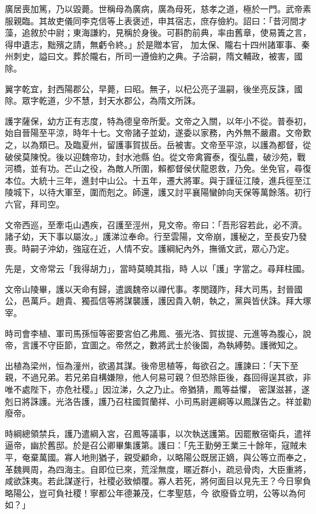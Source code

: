 \begin{pinyinscope}
 廣居喪加篤，乃以毀薨。世稱母為廣病，廣為母死，慈孝之道，極於一門。武帝素服親臨。其故吏儀同李克信等上表褒述，申其宿志，庶存儉約。詔曰：「昔河間才藻，追敘於中尉；東海謙約，見稱於身後。可斟酌前典，率由舊章，使易簀之言，得申遺志，黜殯之請，無虧令終。」於是贈本官，
 加太保、隴右十四州諸軍事、秦州刺史，謚曰文。葬於隴右，所司一遵儉約之典。子洽嗣，隋文輔政，被害，國除。



 翼字乾宜，封西陽郡公，早薨，曰昭。無子，以杞公亮子溫嗣，後坐亮反誅，國除。眾字乾道，少不慧，封天水郡公，為隋文所誅。



 護字薩保，幼方正有志度，特為德皇帝所愛。文帝之入關，以年小不從。普泰初，始自晉陽至平涼，時年十七。文帝諸子並幼，遂委以家務，內外無不嚴肅。文帝歎之，以為類已。及臨夏州，留護事賀拔岳。岳被害。文帝至平涼，以護為都督，從破侯莫陳悅。後以迎魏帝功，封水池縣
 伯。從文帝禽竇泰，復弘農，破沙苑，戰河橋，並有功。芒山之役，為敵人所圍，賴都督侯伏龍恩救，乃免。坐免官，尋復本位。大統十三年，進封中山公。十五年，遷大將軍。與于謹征江陵，進兵徑至江陵城下，以待大軍至，圍而剋之。師還，護又討平襄陽蠻帥向天保等萬餘落。初行六官，拜司空。



 文帝西巡，至牽屯山遇疾，召護至涇州，見文帝。帝曰：「吾形容若此，必不濟。諸子幼，天下事以屬汝。」護涕泣奉命。行至雲陽，文帝崩，護秘之，至長安乃發喪。時嗣子沖幼，強寇在近，人情不安。護綱紀內外，撫循文武，眾心乃定。



 先是，文帝常云「我得胡力」，當時莫曉其指，時
 人以「護」字當之。尋拜柱國。



 文帝山陵畢，護以天命有歸，遣諷魏帝以禪代事。孝閔踐阼，拜大司馬，封晉國公，邑萬戶。趙貴、獨孤信等將謀襲護，護因貴入朝，執之，黨與皆伏誅。拜大塚宰。



 時司會李植、軍司馬孫恒等密要宮伯乙弗鳳、張光洛、賀拔提、元進等為腹心，說帝，言護不守臣節，宜圖之。帝然之，數將武士於後園，為執縛勢。護微知之。



 出植為梁州，恒為潼州，欲遏其謀。後帝思植等，每欲召之。護諫曰：「天下至親，不過兄弟。若兄弟自構嫌隙，他人何易可親？但恐除臣後，姦回得逞其欲，非唯不處陛下，亦危社稷。」因泣涕，久之乃止。帝猶猜，鳳等益懼，
 密謀滋甚，遂剋日將誅護。光洛告護，護乃召柱國賀蘭祥、小司馬尉遲綱等以鳳謀告之。祥並勸廢帝。



 時綱總領禁兵，護乃遣綱入宮，召鳳等議事，以次執送護第。因罷散宿衛兵，遣祥逼帝，幽於舊邸。於是召公卿畢集護第。護曰：「先王勤勞王業三十餘年，寇賊未平，奄棄萬國。寡人地則猶子，親受顧命，以略陽公既居正嫡，與公等立而奉之，革魏興周，為四海主。自即位已來，荒淫無度，暱近群小，疏忌骨肉，大臣重將，咸欲誅夷。若此謀遂行，社稷必致傾覆。寡人若死，將何面目以見先王？今日寧負略陽公，豈可負社稷！寧都公年德兼茂，仁孝聖慈，今
 欲廢昏立明，公等以為何如？」




\end{pinyinscope}
